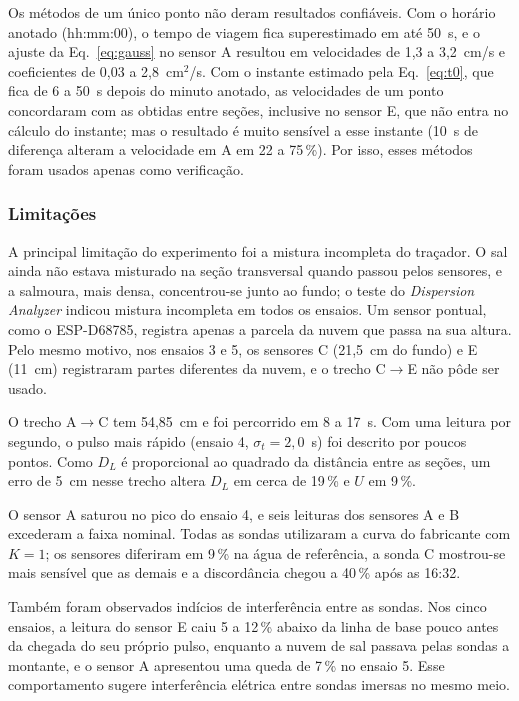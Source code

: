 \documentclass[12pt,a4paper]{article}
\begin{document}
Os métodos de um único ponto não deram resultados confiáveis. Com o horário anotado (hh:mm:00), o tempo de viagem fica superestimado em até 50~s, e o ajuste da Eq.~\eqref{eq:gauss} no sensor A resultou em velocidades de 1,3 a 3,2~cm/s e coeficientes de 0,03 a 2,8~cm$^2$/s. Com o instante estimado pela Eq.~\eqref{eq:t0}, que fica de 6 a 50~s depois do minuto anotado, as velocidades de um ponto concordaram com as obtidas entre seções, inclusive no sensor E, que não entra no cálculo do instante; mas o resultado é muito sensível a esse instante (10~s de diferença alteram a velocidade em A em 22 a 75\,\%). Por isso, esses métodos foram usados apenas como verificação.

\subsubsection{Limitações}
\label{sec:res_limitacoes}

A principal limitação do experimento foi a mistura incompleta do traçador. O sal ainda não estava misturado na seção transversal quando passou pelos sensores, e a salmoura, mais densa, concentrou-se junto ao fundo; o teste do \emph{Dispersion Analyzer} indicou mistura incompleta em todos os ensaios. Um sensor pontual, como o ESP-D68785, registra apenas a parcela da nuvem que passa na sua altura. Pelo mesmo motivo, nos ensaios 3 e 5, os sensores C (21,5~cm do fundo) e E (11~cm) registraram partes diferentes da nuvem, e o trecho C$\rightarrow$E não pôde ser usado.

O trecho A$\rightarrow$C tem 54,85~cm e foi percorrido em 8 a 17~s. Com uma leitura por segundo, o pulso mais rápido (ensaio 4, $\sigma_t = 2{,}0$~s) foi descrito por poucos pontos. Como $D_L$ é proporcional ao quadrado da distância entre as seções, um erro de 5~cm nesse trecho altera $D_L$ em cerca de 19\,\% e $U$ em 9\,\%.

O sensor A saturou no pico do ensaio 4, e seis leituras dos sensores A e B excederam a faixa nominal. Todas as sondas utilizaram a curva do fabricante com $K = 1$; os sensores diferiram em 9\,\% na água de referência, a sonda C mostrou-se mais sensível que as demais e a discordância chegou a 40\,\% após as 16:32.

Também foram observados indícios de interferência entre as sondas. Nos cinco ensaios, a leitura do sensor E caiu 5 a 12\,\% abaixo da linha de base pouco antes da chegada do seu próprio pulso, enquanto a nuvem de sal passava pelas sondas a montante, e o sensor A apresentou uma queda de 7\,\% no ensaio 5. Esse comportamento sugere interferência elétrica entre sondas imersas no mesmo meio.
\end{document}
